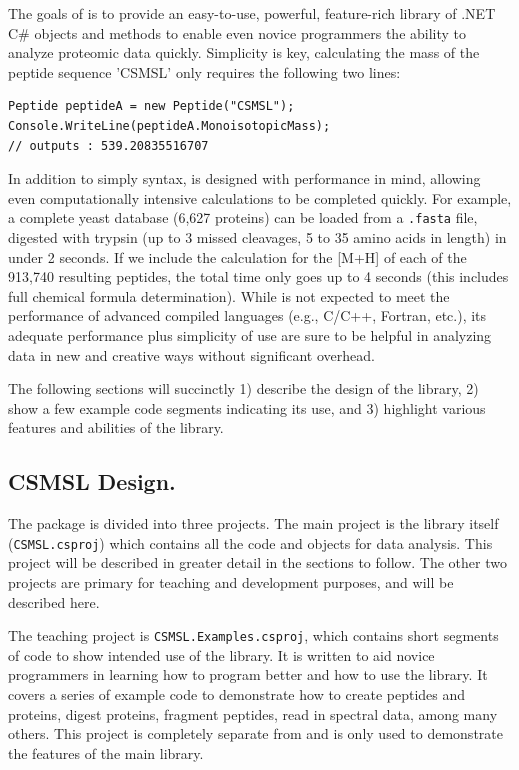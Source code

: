 The goals of \csmsl{} is to provide an easy-to-use, powerful, feature-rich library of .NET C\# objects and methods to enable even novice programmers the ability to analyze proteomic data quickly. Simplicity is key, calculating the mass of the peptide sequence 'CSMSL' only requires the following two lines:
\begin{lstlisting}
Peptide peptideA = new Peptide("CSMSL");
Console.WriteLine(peptideA.MonoisotopicMass);
// outputs : 539.20835516707
\end{lstlisting}
In addition to simply syntax, \csmsl{} is designed with performance in mind, allowing even computationally intensive calculations to be completed quickly. For example, a complete yeast database (6,627 proteins) can be loaded from a \texttt{.fasta} file, digested with trypsin (up to 3 missed cleavages, 5 to 35 amino acids in length) in under 2 seconds. If we include the calculation for the [M+H] \mz{} of each of the 913,740 resulting peptides, the total time only goes up to 4 seconds (this includes full chemical formula determination). While \csmsl{} is not expected to meet the performance of advanced compiled languages (e.g., C/C++, Fortran, etc.), its adequate performance plus simplicity of use are sure to be helpful in analyzing data in new and creative ways without significant overhead.

The following sections will succinctly 1) describe the design of the library, 2) show a few example code segments indicating its use, and 3) highlight various features and abilities of the library.

\subsection*{CSMSL Design.}
The \csmsl{} package is divided into three projects. The main project is the library itself (\texttt{CSMSL.csproj}) which contains all the code and objects for data analysis. This project will be described in greater detail in the sections to follow. The other two projects are primary for teaching and development purposes, and will be described here. 

The teaching project is \texttt{CSMSL.Examples.csproj}, which contains short segments of code to show intended use of the library. It is written to aid novice programmers in learning how to program better and how to use the library. It covers a series of example code to demonstrate how to create peptides and proteins, digest proteins, fragment peptides, read in spectral data, among many others. This project is completely separate from \csmsl{} and is only used to demonstrate the features of the main library. 


